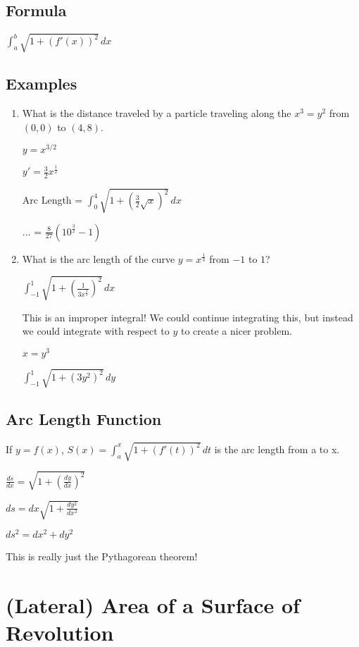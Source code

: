 \documentclass{article}
\begin{document}
\subsection{Formula}

$\int_{a}^{b} \sqrt{1+(f'(x))^2} \,dx$

\subsection{Examples}

\begin{enumerate}
    
\item What is the distance traveled by a particle traveling along the $x^3 = y^2$ from $(0,0)$ to $(4,8)$.

$y = x^{3/2}$

$y' = \frac{3}{2}x^{\frac{1}{2}}$

Arc Length = $\int_{0}^{4} \sqrt{1+(\frac{3}{2}\sqrt{x})^2} \,dx$

... = $\frac{8}{27}(10^{\frac{3}{2}}-1)$

\item What is the arc length of the curve $y = x^{\frac{1}{3}}$ from $-1$ to $1$?

$\int_{-1}^{1} \sqrt{1+ (\frac{1}{3x^{\frac{2}{3}}})^2} \,dx$

This is an improper integral! We could continue integrating this, but instead we could integrate with respect to $y$ to create a nicer problem.

$x = y^3$

$\int_{-1}^{1} \sqrt{1+(3y^2)^2} \,dy$
\end{enumerate}

\subsection{Arc Length Function}

If $y=f(x)$, $S(x) = \int_{a}^{x} \sqrt{1+(f'(t))^2} \,dt$  is the arc length from a to x.

$\frac{ds}{dx} = \sqrt{1+(\frac{dy}{dx})^2}$

$ds = dx \sqrt{1+\frac{dy^2}{dx^2}}$

$ds^2 = dx^2 + dy^2$

This is really just the Pythagorean theorem!

\section{(Lateral) Area of a Surface of Revolution}
\end{document}
